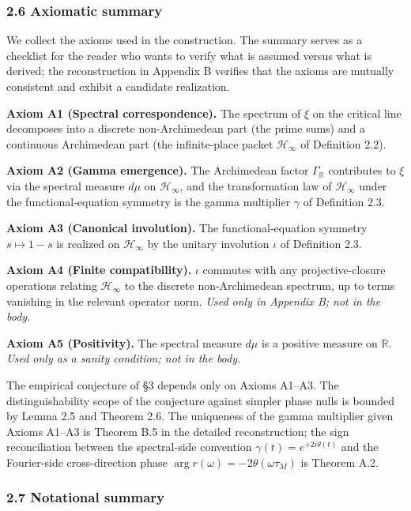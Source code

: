 \documentclass[
  letterpaper,
  11pt]{article}
\theoremstyle{plain}
\theoremstyle{definition}
\theoremstyle{remark}
\begin{document}
\subsubsection{2.6 Axiomatic summary}\label{axiomatic-summary}

We collect the axioms used in the construction. The summary serves as a checklist for the reader who wants to verify what is assumed versus what is derived; the reconstruction in Appendix B verifies that the axioms are mutually consistent and exhibit a candidate realization.

\textbf{Axiom A1 (Spectral correspondence).} The spectrum of \(\xi\) on the critical line decomposes into a discrete non-Archimedean part (the prime sums) and a continuous Archimedean part (the infinite-place packet \(\mathcal{H}_\infty\) of Definition 2.2).

\textbf{Axiom A2 (Gamma emergence).} The Archimedean factor \(\Gamma_{\mathbb{R}}\) contributes to \(\xi\) via the spectral measure \(d\mu\) on \(\mathcal{H}_\infty\), and the transformation law of \(\mathcal{H}_\infty\) under the functional-equation symmetry is the gamma multiplier \(\gamma\) of Definition 2.3.

\textbf{Axiom A3 (Canonical involution).} The functional-equation symmetry \(s \mapsto 1-s\) is realized on \(\mathcal{H}_\infty\) by the unitary involution \(\iota\) of Definition 2.3.

\textbf{Axiom A4 (Finite compatibility).} \(\iota\) commutes with any projective-closure operations relating \(\mathcal{H}_\infty\) to the discrete non-Archimedean spectrum, up to terms vanishing in the relevant operator norm. \emph{Used only in Appendix B; not in the body.}

\textbf{Axiom A5 (Positivity).} The spectral measure \(d\mu\) is a positive measure on \(\mathbb{R}\). \emph{Used only as a sanity condition; not in the body.}

The empirical conjecture of §3 depends only on Axioms A1--A3. The distinguishability scope of the conjecture against simpler phase nulls is bounded by Lemma 2.5 and Theorem 2.6. The uniqueness of the gamma multiplier given Axioms A1--A3 is Theorem B.5 in the detailed reconstruction; the sign reconciliation between the spectral-side convention \(\gamma(t) = e^{+2i\theta(t)}\) and the Fourier-side cross-direction phase \(\arg r(\omega) = -2\theta(\omega\tau_M)\) is Theorem A.2.

\subsubsection{2.7 Notational summary}\label{notational-summary}
\end{document}
